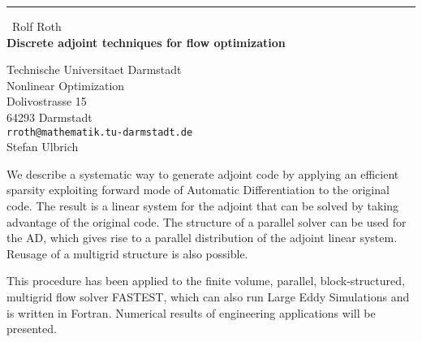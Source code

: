 \documentclass{report}
\begin{document}
\begin{center}
\rule{6in}{1pt} \
{\large Rolf Roth \\
{\bf Discrete adjoint techniques for flow optimization}}

Technische Universitaet Darmstadt \\ Nonlinear Optimization \\ Dolivostrasse 15 \\ 64293 Darmstadt
\\
{\tt rroth@mathematik.tu-darmstadt.de}\\
Stefan Ulbrich\end{center}

We describe a systematic way to generate adjoint code by applying an
efficient sparsity exploiting forward mode of Automatic Differentiation
to the original code. The result is a linear system for the adjoint that
can be solved by taking advantage of the original code.
The structure of a parallel solver can be used for the AD, which gives
rise to a parallel distribution of the adjoint linear system. Reusage of
a multigrid structure is also possible.

This procedure has been applied to the finite volume, parallel,
block-structured, multigrid flow solver FASTEST, which can also run Large
Eddy Simulations and is written in Fortran. Numerical results of
engineering applications will be presented.
\end{document}
